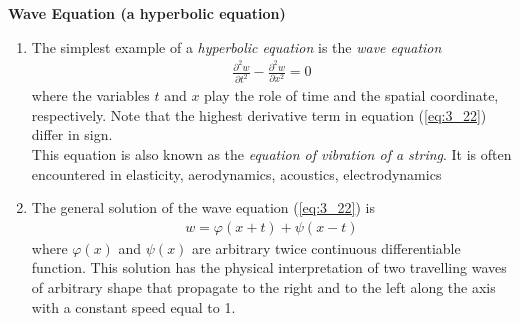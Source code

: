 \documentclass[11pt]{report}
\newcommand{\NI}{\noindent}
\newcommand{\refn}[1]{(\ref{#1})}
\newcommand{\refx}[1]{\refn{eq:#1}}
\newcommand{\bt}[1]{\textbf{#1}}
\begin{document}
	\NI\bt{Wave Equation (a hyperbolic equation)}
	\begin{enumerate}
		\item The simplest example of a \textit{hyperbolic equation} is the \textit{wave equation}
		\begin{eqnarray}
			\frac{\partial^2 w}{\partial t^2} - \frac{\partial^2 w}{\partial x^2} = 0\label{eq:3_22}
		\end{eqnarray}
		where the variables $t$ and $x$ play the role of time and the spatial coordinate, respectively. Note that the highest derivative term in equation \refx{3_22} differ in sign.\\
		This equation is also known as the \textit{equation of vibration of a string}. It is often encountered in elasticity, aerodynamics, acoustics, electrodynamics
		
		\item The general solution of the wave equation \refx{3_22} is
		\begin{eqnarray}
			w = \varphi(x+t) + \psi(x-t)\label{eq:3_23}
		\end{eqnarray}
		where $\varphi(x)$ and $\psi(x)$ are arbitrary twice continuous differentiable function. This solution has the physical interpretation of two travelling waves of arbitrary shape that propagate to the right and to the left along the axis with a constant speed equal to 1.
	\end{enumerate}
\end{document}
